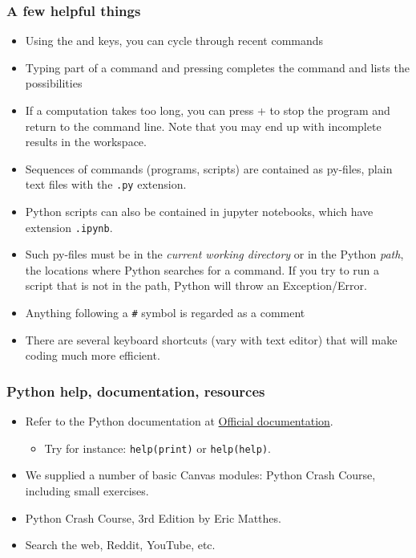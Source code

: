  
 {\nologo
 \begin{frame}[fragile]
  \frametitle{A few helpful things}
  \begin{itemize}[<+->]
    \item Using the \keystroke{$\uparrow$} and \keystroke{$\downarrow$} keys, you can cycle through recent commands
    \item Typing part of a command and pressing  completes the command and lists the possibilities
    \item If a computation takes too long, you can press + to stop the program and return to the command line. Note that you may end up with incomplete results in the workspace.
    \item Sequences of commands (programs, scripts) are contained as py-files, plain text files with the \lstinline$.py$ extension.
    \item Python scripts can also be contained in jupyter notebooks, which have extension \lstinline$.ipynb$.
    \item Such py-files must be in the \emph{current working directory} or in the Python \emph{path}, the locations where Python searches for a command. If you try to run a script that is not in the path, Python will throw an Exception/Error.
    \item Anything following a \lstinline$#$ symbol is regarded as a comment
    \item There are several keyboard shortcuts (vary with text editor) that will make coding much more efficient.
  \end{itemize}
\end{frame}
}

\begin{frame}[fragile]
\frametitle{Python help, documentation, resources}
\begin{itemize}[<+->]
  \item Refer to the Python documentation at \href{https://docs.python.org/3/}{Official documentation}.
  \begin{itemize}
    \item Try for instance: \lstinline$help(print)$ or \lstinline$help(help)$.
  \end{itemize}
  \item We supplied a number of basic Canvas modules: Python Crash Course, including small exercises.
  \item Python Crash Course, 3rd Edition by Eric Matthes.
  \item Search the web, Reddit, YouTube, etc.
\end{itemize}
\end{frame}

